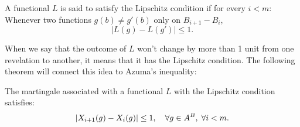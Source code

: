 \begin{definition}
    A functional $L$ is said to satisfy the Lipschitz condition if for every $i < m$: Whenever two functions $g(b) \neq g'(b)$ only on $B_{i+1}- B_i$,
    \[ |L(g) - L(g')| \leq 1. \] 
\end{definition}

When we say that the outcome of $L$ won't change by more than 1 unit from one revelation to another, it means that it has the Lipschitz condition. The following theorem will connect this idea to Azuma's inequality:

\begin{theorem}\label{lipschitz-condition}
    The martingale associated with a functional $L$ with the Lipschitz condition satisfies:
    \[ |X_{i+1}(g)- X_i(g)| \leq 1,\hspace*{1em} \forall g\in A^B,\; \forall i < m. \] 
\end{theorem}

